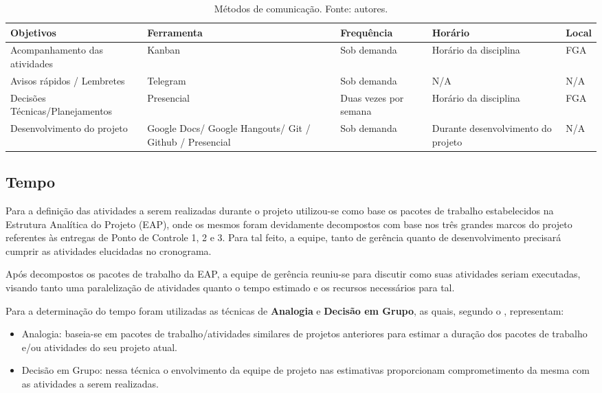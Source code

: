       \begin{table}[!htbp]
      	\begin{center}
      		\caption{\label{tab:com}Métodos de comunicação. Fonte: autores.}
      		\begin{tabular}{|p{4cm}|p{4cm}|p{3cm}|p{3cm}|p{2cm}|}
      			\hline
      			\textbf{Objetivos} & \textbf{Ferramenta} & \textbf{Frequência} & \textbf{Horário} & \textbf{Local}\\\hline\hline
      			Acompanhamento das atividades & Kanban & Sob demanda & Horário da disciplina & FGA\\\hline
      			Avisos rápidos / Lembretes & Telegram & Sob demanda & N/A & N/A\\\hline
      			Decisões Técnicas/Planejamentos & Presencial & Duas vezes por semana & Horário da disciplina & FGA\\\hline
      			Desenvolvimento do projeto & Google Docs/ Google Hangouts/ Git / Github / Presencial & Sob demanda & Durante desenvolvimento do projeto & N/A\\\hline
      		\end{tabular}
      	\end{center}
      \end{table}

    \subsection{Tempo}

      Para a definição das atividades a serem realizadas durante o
      projeto utilizou-se como base os pacotes de trabalho estabelecidos
      na Estrutura Analítica do Projeto (EAP), onde os mesmos foram devidamente
      decompostos com base nos três grandes marcos do projeto referentes
      às entregas de Ponto de Controle 1, 2 e 3. Para tal feito, a equipe,
      tanto de gerência quanto de desenvolvimento precisará cumprir
      as atividades elucidadas no cronograma.

      Após decompostos os pacotes de trabalho da EAP, a equipe
      de gerência reuniu-se para discutir como suas atividades seriam
      executadas, visando tanto uma paralelização de atividades quanto
      o tempo estimado e os recursos necessários para tal.

      Para a determinação do tempo foram utilizadas as
      técnicas de \textbf{Analogia} e \textbf{Decisão em Grupo},
      as quais, segundo o \cite{PMI2012}, representam:

      \begin{itemize}
        \item Analogia: baseia-se em pacotes de trabalho/atividades similares
        de projetos anteriores para estimar a duração dos pacotes de trabalho
        e/ou atividades do seu projeto atual.
        \item Decisão em Grupo: nessa técnica o envolvimento da equipe de projeto
        nas estimativas proporcionam comprometimento da mesma com as
        atividades a serem realizadas.
      \end{itemize}


